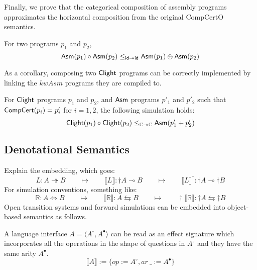 \documentclass[sigplan,10pt,authordraft]{acmart}
\begin{document}
Finally, we prove that the categorical composition of assembly programs
approximates the horizontal composition from the original CompCertO
semantics.
\begin{theorem}
  For two  programs $p_1$ and $p_2$,
  \[
     \mathsf{Asm} (p_1) \circ  \mathsf{Asm} (p_2) \le_{ \mathsf{id}  \twoheadrightarrow  \mathsf{id} }
     \mathsf{Asm} (p_1) \oplus  \mathsf{Asm} (p_2)
  \]
\end{theorem}
As a corollary, composing two $ \mathsf{Clight} $ programs can be correctly
implemented by linking the $kw{Asm}$ programs they are compiled to.
\begin{corollary}
  For $ \mathsf{Clight} $ programs $p_1$ and $p_2$, and $ \mathsf{Asm} $ programs
  $p'_1$ and $p'_2$ such that $ \mathsf{CompCert} (p_i) = p'_i$ for $i=1,2$,
  the following simulation holds:
  \[
     \mathsf{Clight} (p_1)\circ \mathsf{Clight} (p_2) \le_{\mathbb{C} \twoheadrightarrow \mathbb{C}}
     \mathsf{Asm} (p'_1 + p'_2)
  \]
\end{corollary}

\subsection{Denotational Semantics}

Explain the embedding, which goes:
\[
  L : A \twoheadrightarrow B
  \qquad \mapsto \qquad
  \llbracket L \rrbracket : {\dagger} A \multimap B
  \qquad \mapsto \qquad
  \llbracket L \rrbracket^\dagger : {\dagger} A \multimap {\dagger} B
\]
For simulation conventions, something like:
\[
  \mathbb{R} : A \Leftrightarrow B
  \qquad \mapsto \qquad
  \llbracket \mathbb{R} \rrbracket : A \leftrightarrows B
  \qquad \mapsto \qquad
  {\dagger}\llbracket \mathbb{R} \rrbracket :
    {\dagger}A \leftrightarrows {\dagger}B
\]
Open transition systems and forward simulations can be embedded into
object-based semantics as follows.

A language interface
$A = \langle A^\circ, A^\bullet \rangle$ can be read as an effect signature
which incorporates all the operations in the shape of questions in $A^\circ$ and
they have the same arity $A^\bullet$.
\[
  \llbracket A \rrbracket \mathrel{:=}
  \{ op \mathrel{:=} A^\circ, ar\ \_ \mathrel{:=} A^\bullet \}
\]
\end{document}
